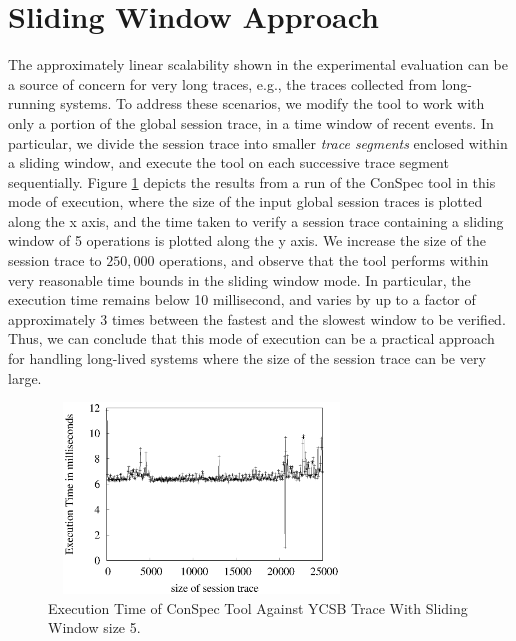 \documentclass[conference]{IEEEtran}
\begin{document}
	\section{Sliding Window Approach}\label{sec:additionalYCSBexp}
	The approximately linear scalability shown in the experimental evaluation can be a source of concern for very long traces, e.g., the traces collected from long-running systems. To address these scenarios, we modify the tool to work with only a portion of the global session trace, in a time window of recent events. In particular, we divide the session trace into smaller \emph{trace segments} enclosed within a sliding window, and execute  the tool on  each successive trace segment sequentially.   Figure \ref{fig:exampleIter} depicts the results from a run of the ConSpec tool in this mode of execution, where the size of the input global session traces is plotted along the x axis, and the time taken to verify a session trace containing a sliding window of 5 operations is plotted along the y axis. We increase the size of the session trace to $250,000$ operations, and observe that the tool performs within very reasonable time bounds in the sliding window mode. In particular, the execution time remains below %
	10 millisecond, and varies by up to a factor of approximately 3 times between the fastest and the slowest window to be verified.   Thus, we can conclude that this mode of execution can be a practical approach for handling long-lived systems where the size of the session trace can be very large.
\begin{figure}%
	\includegraphics[width=3.2in,height=2in]
	{conspecExecutionTimes.eps} %
	\caption{Execution Time of ConSpec Tool Against YCSB Trace With Sliding Window size 5.}
	\label{fig:exampleIter}
\end{figure}
\end{document}
